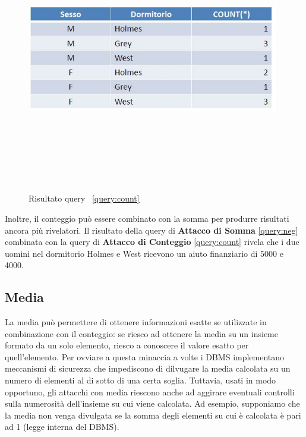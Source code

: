\begin{figure}[htpb]
	\centering
		{\includegraphics[height=11cm, width=11cm, keepaspectratio]{Immagini/dati_sensibili/prot_dati_08.JPG}}
							\caption{Risultato query ~\ref{query:count} \label{fig:query_indiretta_result1}}                           
\end{figure}

Inoltre, il conteggio può essere combinato con la somma per produrre risultati ancora più rivelatori. Il risultato della query di \textbf{Attacco di Somma} \ref{query:neg} combinata con la query di \textbf{Attacco di Conteggio} \ref{query:count} rivela che i due uomini nel dormitorio Holmes e West ricevono un aiuto finanziario di 5000 e 4000.

\subsection{Media}

La media può permettere di ottenere informazioni esatte se utilizzate in combinazione con il conteggio: se riesco ad ottenere la media su un insieme formato da un solo elemento, riesco a conoscere il valore esatto per quell’elemento. Per ovviare a questa minaccia a volte i DBMS implementano meccanismi di sicurezza che impediscono di dilvugare la media calcolata su un numero di elementi al di sotto di una certa soglia. Tuttavia, usati in modo opportuno, gli attacchi con media riescono anche ad aggirare eventuali controlli sulla numerosità dell'insieme su cui viene calcolata. Ad esempio, supponiamo che la media non venga divulgata se la somma degli elementi su cui è calcolata è pari ad 1 (legge interna del DBMS). 

